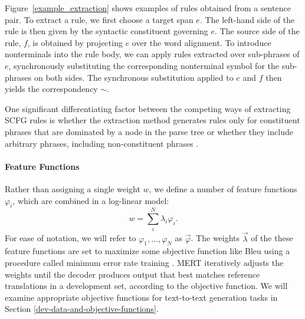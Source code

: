 \documentclass[11pt]{article}
\begin{document}
Figure~\ref{example_extraction} shows examples
of rules obtained from a sentence pair. To extract a rule, we first
choose a target span $e$. The left-hand side of the rule is then given
by the syntactic constituent governing $e$. 
The source side of the rule, $f$, is obtained by projecting $e$ over
the word alignment. To introduce nonterminals into the rule body, we
can apply rules extracted over sub-phrases of $e$, synchronously
substituting the corresponding nonterminal symbol for the sub-phrases
on both sides. The synchronous substitution applied to $e$ and $f$
then yields the correspondency $\sim$.

One significant differentiating factor between the competing ways of extracting SCFG rules is whether the extraction method generates rules only for constituent phrases that are dominated by a node in the parse tree \cite{Galley2004,cohn-lapata:2008} or whether they include arbitrary phrases, including non-constituent phrases \cite{Zollmann2006,Callison-Burch2008}. 




\paragraph{Feature Functions}

Rather than assigning a single weight $w$, we define a number of feature
functions $\varphi_i$, which are combined in a log-linear model:
\begin{equation}
  w = \sum_i^N \lambda_i \varphi_i .
\end{equation}
For ease of notation, we will refer to $\varphi_1, \ldots ,\varphi_N$
as $\vec{\varphi}$. 
The weights $\vec{\lambda}$ of the these feature functions are set to maximize some objective function like Bleu \cite{Papineni2002} using a procedure called minimum error rate training \cite{Och2003c}.  MERT iteratively adjusts the weights until the decoder produces output that best matches reference translations in a development set, according to the objective function.  We will examine appropriate objective functions for text-to-text generation tasks in Section \ref{dev-data-and-objective-functions}.
\end{document}

